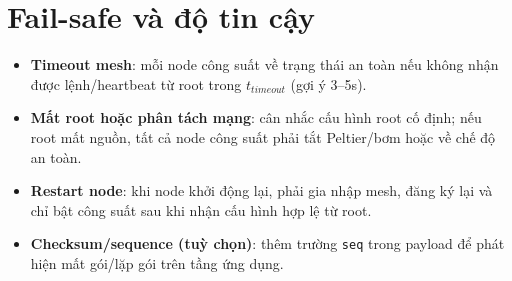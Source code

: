 \documentclass[12pt,a4paper]{report}
\begin{document}
\section{Fail-safe và độ tin cậy}
\begin{itemize}
  \item \textbf{Timeout mesh}: mỗi node công suất về trạng thái an toàn nếu không nhận được lệnh/heartbeat từ root trong $t_{timeout}$ (gợi ý 3--5s).
  \item \textbf{Mất root hoặc phân tách mạng}: cân nhắc cấu hình root cố định; nếu root mất nguồn, tất cả node công suất phải tắt Peltier/bơm hoặc về chế độ an toàn.
  \item \textbf{Restart node}: khi node khởi động lại, phải gia nhập mesh, đăng ký lại và chỉ bật công suất sau khi nhận cấu hình hợp lệ từ root.
  \item \textbf{Checksum/sequence (tuỳ chọn)}: thêm trường \texttt{seq} trong payload để phát hiện mất gói/lặp gói trên tầng ứng dụng.
\end{itemize}
\end{document}
